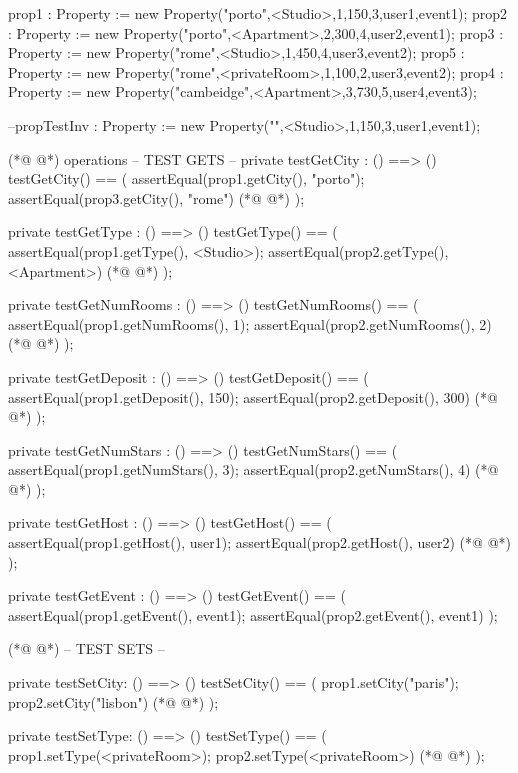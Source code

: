 \begin{vdmpp}[breaklines=true]
 prop1 : Property := new Property("porto",<Studio>,1,150,3,user1,event1);
 prop2 : Property := new Property("porto",<Apartment>,2,300,4,user2,event1);
 prop3 : Property := new Property("rome",<Studio>,1,450,4,user3,event2);
 prop5 : Property := new Property("rome",<privateRoom>,1,100,2,user3,event2);
 prop4 : Property := new Property("cambeidge",<Apartment>,3,730,5,user4,event3);
 
 --propTestInv : Property := new Property("",<Studio>,1,150,3,user1,event1);
 
 
 
(*@
\label{testGetCity:139}
@*)
operations
 -- TEST GETS --
 private testGetCity : () ==> ()
  testGetCity() == 
  (
   assertEqual(prop1.getCity(), "porto");
   assertEqual(prop3.getCity(), "rome")
(*@
\label{testGetType:146}
@*)
  );
  
 private testGetType : () ==> ()
  testGetType() == 
  (
   assertEqual(prop1.getType(), <Studio>);
   assertEqual(prop2.getType(), <Apartment>)
(*@
\label{testGetNumRooms:153}
@*)
  );
 
 private testGetNumRooms : () ==> ()
  testGetNumRooms() == 
  (
   assertEqual(prop1.getNumRooms(), 1);
   assertEqual(prop2.getNumRooms(), 2)
(*@
\label{testGetDeposit:160}
@*)
  );
 
 private testGetDeposit : () ==> ()
  testGetDeposit() == 
  (
   assertEqual(prop1.getDeposit(), 150);
   assertEqual(prop2.getDeposit(), 300)
(*@
\label{testGetNumStars:167}
@*)
  );
  
 private testGetNumStars : () ==> ()
  testGetNumStars() == 
  (
   assertEqual(prop1.getNumStars(), 3);
   assertEqual(prop2.getNumStars(), 4)
(*@
\label{testGetHost:174}
@*)
  );
  
 private testGetHost : () ==> ()
  testGetHost() == 
  (
   assertEqual(prop1.getHost(), user1);
   assertEqual(prop2.getHost(), user2)
(*@
\label{testGetEvent:181}
@*)
  );
  
 private testGetEvent : () ==> ()
  testGetEvent() == 
  (
   assertEqual(prop1.getEvent(), event1);
   assertEqual(prop2.getEvent(), event1)
  );
   
(*@
\label{testSetCity:190}
@*)
 -- TEST SETS --
 
 private testSetCity: () ==> ()
  testSetCity() ==
  (
   prop1.setCity("paris");
   prop2.setCity("lisbon")
(*@
\label{testSetType:197}
@*)
  );
 
 private testSetType: () ==> ()
  testSetType() ==
  (
   prop1.setType(<privateRoom>);
   prop2.setType(<privateRoom>)
(*@
\label{testSetNumRooms:204}
@*)
  );
 

\end{vdmpp}
